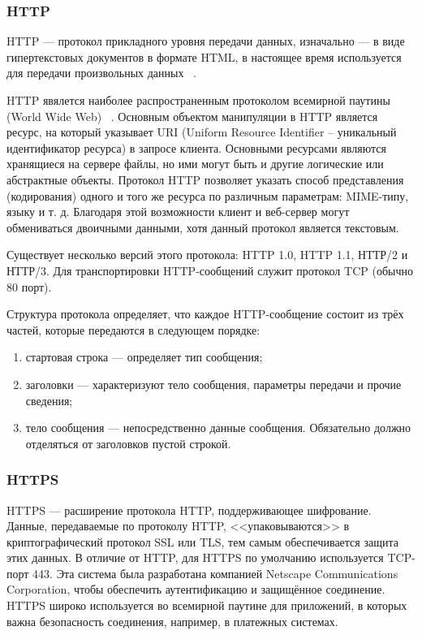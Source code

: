 \documentclass[a4paper,14pt]{extarticle}
\begin{document}
 	\subsubsection{HTTP}
 	
 	HTTP — протокол прикладного уровня передачи данных, изначально — в виде гипертекстовых документов в формате HTML, в настоящее время используется для передачи произвольных данных ~\cite{http}.
 	
 	HTTP явялется наиболее распространенным протоколом всемирной паутины (World Wide Web) ~\cite{www}. Основным объектом манипуляции в HTTP является ресурс, на который указывает URI (Uniform Resource Identifier – уникальный идентификатор ресурса) в запросе клиента. Основными ресурсами являются хранящиеся на сервере файлы, но ими могут быть и другие логические или абстрактные объекты. Протокол HTTP позволяет указать способ представления (кодирования) одного и того же ресурса по различным параметрам: MIME-типу, языку и т. д. Благодаря этой возможности клиент и веб-сервер могут обмениваться двоичными данными, хотя данный протокол является текстовым.
 	
 	Существует несколько версий этого протокола: HTTP 1.0, HTTP 1.1, НТТР/2 и НТТР/3. Для транспортировки HTTP-сообщений служит протокол TCP (обычно 80 порт).
 	
 	Структура протокола определяет, что каждое HTTP-сообщение состоит из трёх частей, которые передаются в следующем порядке:
 	
 	\begin{enumerate}
 		\item стартовая строка — определяет тип сообщения;
 		\item заголовки  — характеризуют тело сообщения, параметры передачи и прочие сведения;
 		\item тело сообщения — непосредственно данные сообщения. Обязательно должно отделяться от заголовков пустой строкой.
 	\end{enumerate}
 
 	\subsubsection{HTTPS}
 	
 	HTTPS — расширение протокола HTTP, поддерживающее шифрование. Данные, передаваемые по протоколу HTTP, <<упаковываются>> в криптографический протокол SSL или TLS, тем самым обеспечивается защита этих данных. В отличие от HTTP, для HTTPS по умолчанию используется TCP-порт 443. Эта система была разработана компанией Netscape Communications Corporation, чтобы обеспечить аутентификацию и защищённое соединение. HTTPS широко используется во всемирной паутине для приложений, в которых важна безопасность соединения, например, в платежных системах.
 	
\end{document}
